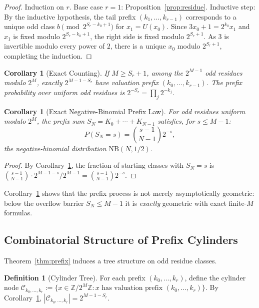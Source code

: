 \documentclass[12pt]{article}
\newtheorem{corollary}[theorem]{Corollary}
\theoremstyle{definition}
\newtheorem{definition}[theorem]{Definition}
\theoremstyle{remark}
\begin{document}
\begin{proof}
Induction on $r$.
Base case $r=1$: Proposition~\ref{prop:residue}.
Inductive step: By the inductive hypothesis, the tail prefix
$(k_1,\ldots,k_{r-1})$ corresponds to a unique odd class
$b\pmod{2^{S_r-k_0+1}}$ for $x_1=U(x_0)$.
Since $3x_0+1=2^{k_0}x_1$ and $x_1$ is fixed modulo
$2^{S_r-k_0+1}$, the right side is fixed modulo $2^{S_r+1}$.
As $3$ is invertible modulo every power of $2$, there is a unique $x_0$
modulo $2^{S_r+1}$, completing the induction.
\end{proof}

\begin{corollary}[Exact Counting]\label{cor:count}
If $M\geq S_r+1$, among the $2^{M-1}$ odd residues modulo $2^M$,
exactly $2^{M-1-S_r}$ have valuation prefix $(k_0,\ldots,k_{r-1})$.
The prefix probability over uniform odd residues is
$2^{-S_r}=\prod_j 2^{-k_j}$.
\end{corollary}

\begin{corollary}[Exact Negative-Binomial Prefix Law]\label{cor:negbin}
For odd residues uniform modulo $2^M$, the prefix sum
$S_N=K_0+\cdots+K_{N-1}$ satisfies, for $s\leq M-1$:
\[
P(S_N=s) = \binom{s-1}{N-1}2^{-s},
\]
the negative-binomial distribution $\mathrm{NB}(N,1/2)$.
\end{corollary}

\begin{proof}
By Corollary~\ref{cor:count}, the fraction of starting classes with
$S_N=s$ is $\binom{s-1}{N-1}\cdot 2^{M-1-s}/2^{M-1}=\binom{s-1}{N-1}2^{-s}$.
\end{proof}

Corollary~\ref{cor:negbin} shows that the prefix process is not merely
asymptotically geometric: below the overflow barrier $S_N\leq M-1$
it is \emph{exactly} geometric with exact finite-$M$ formulas.

\subsection{Combinatorial Structure of Prefix Cylinders}\label{sec:comb}

Theorem~\ref{thm:prefix} induces a tree structure on odd residue classes.

\begin{definition}[Cylinder Tree]
For each prefix $(k_0,\ldots,k_r)$, define the cylinder node
$\mathcal{C}_{k_0,\ldots,k_r} :=
\{x\in\mathbb{Z}/2^M\mathbb{Z}:x\text{ has valuation prefix }
(k_0,\ldots,k_r)\}$.
By Corollary~\ref{cor:count}, $|\mathcal{C}_{k_0,\ldots,k_r}|
=2^{M-1-S_r}$.
\end{definition}
\end{document}
